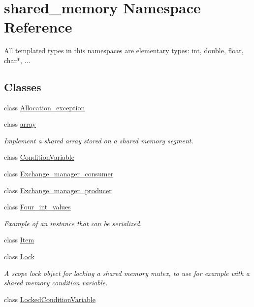 \hypertarget{namespaceshared__memory}{}\section{shared\+\_\+memory Namespace Reference}
\label{namespaceshared__memory}


All templated types in this namespaces are elementary types\+: int, double, float, char$\ast$, ...  


\subsection*{Classes}
\begin{DoxyCompactItemize}
\item 
class \hyperlink{classshared__memory_1_1Allocation__exception}{Allocation\+\_\+exception}
\item 
class \hyperlink{classshared__memory_1_1array}{array}
\begin{DoxyCompactList}\small\item\em Implement a shared array stored on a shared memory segment. \end{DoxyCompactList}\item 
class \hyperlink{classshared__memory_1_1ConditionVariable}{Condition\+Variable}
\item 
class \hyperlink{classshared__memory_1_1Exchange__manager__consumer}{Exchange\+\_\+manager\+\_\+consumer}
\item 
class \hyperlink{classshared__memory_1_1Exchange__manager__producer}{Exchange\+\_\+manager\+\_\+producer}
\item 
class \hyperlink{classshared__memory_1_1Four__int__values}{Four\+\_\+int\+\_\+values}
\begin{DoxyCompactList}\small\item\em Example of an instance that can be serialized. \end{DoxyCompactList}\item 
class \hyperlink{classshared__memory_1_1Item}{Item}
\item 
class \hyperlink{classshared__memory_1_1Lock}{Lock}
\begin{DoxyCompactList}\small\item\em A scope lock object for locking a shared memory mutex, to use for example with a shared memory condition variable. \end{DoxyCompactList}\item 
class \hyperlink{classshared__memory_1_1LockedConditionVariable}{Locked\+Condition\+Variable}

\end{DoxyCompactItemize}
